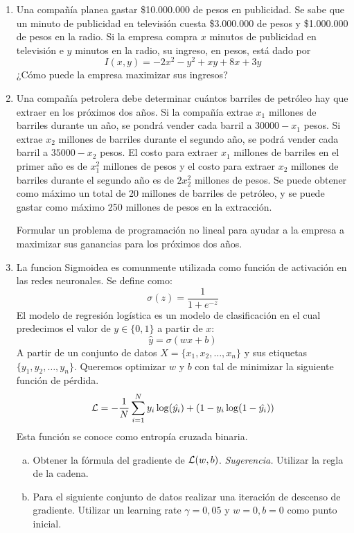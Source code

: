 \documentclass[12pt]{article}
\begin{document}
\begin{center}
\begin{enumerate}

            \item Una compañía planea gastar \$10.000.000 de pesos en publicidad. 
            Se sabe que un minuto de publicidad en televisión cuesta \$3.000.000 de pesos y \$1.000.000 de pesos en la radio. 
            Si la empresa compra $x$ minutos de publicidad en televisión e $y$ minutos en la radio, su ingreso, en pesos, está dado por
            \[
             I(x,y) = -2x^{2} - y^{2} + xy + 8x + 3y
            \]
            ¿Cómo puede la empresa maximizar sus ingresos?

            \item Una compañía petrolera debe determinar cuántos barriles de petróleo hay que extraer en los próximos dos años. 
            Si la compañía extrae $x_{1}$ millones de barriles durante un año, se
            pondrá vender cada barril a $30000-x_{1}$ pesos. Si extrae $x_{2}$ millones de barriles durante el segundo año, se podrá vender cada barril a $35000-x_{2}$ pesos. El costo para extraer $x_{1}$ millones de barriles en el primer año es de $x_{1}^{2}$
            millones de pesos y el costo para extraer $x_{2}$ millones de barriles durante el segundo año es de $2x_{2}^{2}$ millones de pesos. 
            Se puede obtener como máximo un total de 20 millones de barriles de petróleo, y se puede gastar como máximo 250 millones de pesos en la extracción. 

            Formular un problema de programación no lineal para ayudar a la empresa a maximizar
            sus ganancias para los próximos dos años.

            \item La funcion Sigmoidea es comunmente utilizada como función de activación
            en las redes neuronales. 
            Se define como:
            \[
             \sigma(z) = \frac{1}{1+e^{-z}}
            \]
            El modelo de regresión logística es un modelo de clasificación en el cual predecimos el valor de $y \in \{0,1\}$ a partir de $x$:
            \[
             \hat{y} = \sigma(wx + b)
            \]
            A partir de un conjunto de datos $X = \{x_{1},x_{2},\dots,x_{n}\}$ y sus etiquetas $\{y_{1},y_{2}, \dots, y_{n}\}$.
            Queremos optimizar $w$ y $b$ con tal de minimizar la siguiente función de pérdida.
            \[
             {\cal L} = -\frac{1}{N} \sum_{i=1}^{N} y_{i}\log(\hat{y_{i}}) + (1-y_{i}\log(1-\hat{y_{i}}))
            \]
            Esta función se conoce como entropía cruzada binaria.
            \begin{enumerate}[a)]
                \item Obtener la fórmula del gradiente de ${\cal L}(w,b)$.
                    \emph{Sugerencia.} Utilizar la regla de la cadena.
                \item Para el siguiente conjunto de datos realizar una iteración de descenso de gradiente.
                Utilizar un learning rate $\gamma = 0,05$ y $w=0, b =0$ como punto inicial.



\end{enumerate}
\end{enumerate}
\end{center}
\end{document}

